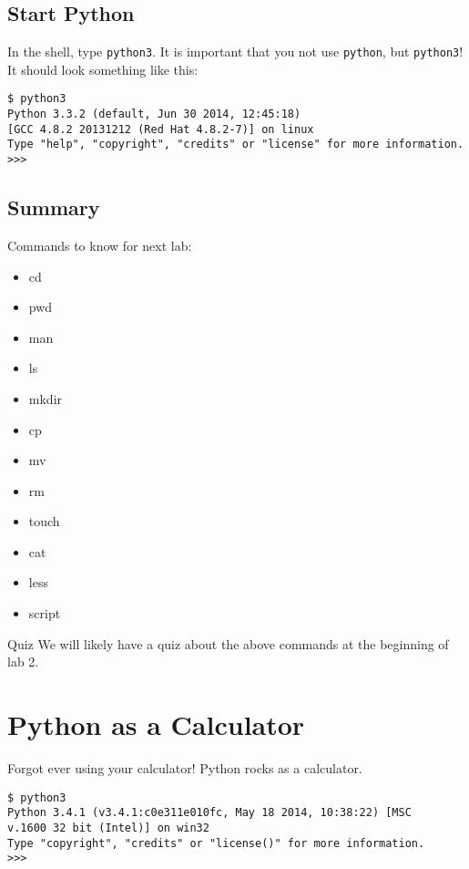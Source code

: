 \documentclass[11pt]{cselabheader}
\begin{document}
\subsection{Start Python}

In the shell, type \texttt{python3}. It is important that you not use
\texttt{python}, but \texttt{python3}! It should look something like this:
\begin{lstlisting}[style=bash]
$ python3
Python 3.3.2 (default, Jun 30 2014, 12:45:18) 
[GCC 4.8.2 20131212 (Red Hat 4.8.2-7)] on linux
Type "help", "copyright", "credits" or "license" for more information.
>>> 
\end{lstlisting}

\subsection{Summary}

Commands to know for next lab:
\begin{multicols}{3}
\begin{itemize}
  \item cd
  \item pwd
  \item man
  \item ls
  \item mkdir
  \item cp
  \item mv
  \item rm
  \item touch
  \item cat
  \item less
  \item script
\end{itemize}
\end{multicols}

\begin{warningbox}{Quiz}
  We will likely have a quiz about the above commands at the beginning of lab 2.
\end{warningbox}

\pagebreak
\section{Python as a Calculator}
\label{sec:python-calc}
Forgot ever using your calculator! Python rocks as a calculator.

\begin{lstlisting}[style=bash]
$ python3
Python 3.4.1 (v3.4.1:c0e311e010fc, May 18 2014, 10:38:22) [MSC
v.1600 32 bit (Intel)] on win32
Type "copyright", "credits" or "license()" for more information.
>>> 
\end{lstlisting}
\end{document}
